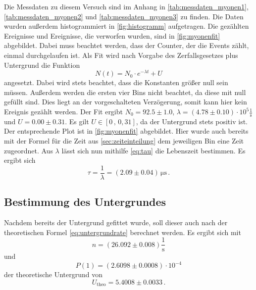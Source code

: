 Die Messdaten zu diesem Versuch sind im Anhang in \autoref{tab:messdaten_myonen1}, \autoref{tab:messdaten_myonen2} und \autoref{tab:messdaten_myonen3} zu finden.
Die Daten wurden außerdem histogrammiert in \autoref{fig:histogramm} aufgetragen.
Die gezählten Ereignisse und Ereignisse, die verworfen wurden, sind in \autoref{fig:myonenfit} abgebildet.
Dabei muss beachtet werden, dass der Counter, der die Events zählt, einmal durchgelaufen ist.
Als Fit wird nach Vorgabe des Zerfallsgesetzes plus Untergrund die Funktion
\begin{equation*}
    N(t) = N_0 \cdot e^{- \lambda t} + U
\end{equation*} 
angesetzt.
Dabei wird stets beachtet, dass die Konstanten größer null sein müssen.
Außerdem werden die ersten vier Bins nicht beachtet, da diese mit null gefüllt sind.
Dies liegt an der vorgeschalteten Verzögerung, somit kann hier kein Ereignis gezählt werden.
Der Fit ergibt $N_0 = 92.5 \pm 1.0$, $\lambda = (4.78 \pm 0.10) \cdot 10^5 \frac{1}{\unit{\second}}$ und $U = 0.00 \pm 0.31$.
Es gilt $U \in [0 \, , \, 0,31]$, da der Untergrund stets positiv ist.
Der entsprechende Plot ist in \autoref{fig:myonenfit} abgebildet.
Hier wurde auch bereits mit der Formel für die Zeit aus \autoref{sec:zeiteinteilung} dem jeweiligen Bin eine Zeit zugeordnet.
Aus $\lambda$ lässt sich nun mithilfe \autoref{eq:tau} die Lebenszeit bestimmen.
Es ergibt sich
\begin{equation}
    \tau = \frac{1}{\lambda} = (2.09\pm 0.04) \, \unit{\micro\second} \, .
\end{equation}

\subsection{Bestimmung des Untergrundes} \label{sec:untergrund_ausw}

Nachdem bereits der Untergrund gefittet wurde, soll dieser auch nach der theoretischen Formel \autoref{eq:untergrundrate} berechnet werden.
Es ergibt sich mit
\begin{equation*}
    n = (26.092\pm0.008) \frac{1}{\unit\second}
\end{equation*}
und
\begin{equation*}
    P(1) = (2.6098 \pm 0.0008) \cdot 10^{-4}
\end{equation*}
der theoretische Untergrund von
\begin{equation*}
    U_\text{theo} = 5.4008 \pm 0.0033 \, .
\end{equation*}